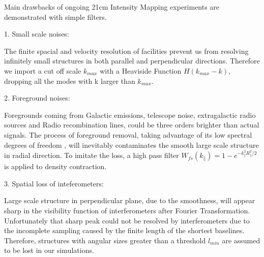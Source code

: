 Main drawbacks of ongoing 21cm Intensity Mapping 
experiments are demonstrated with simple filters. 

1. Small scale noises:

The finite spacial and velocity resolution of facilities 
prevent us from resolving infinitely small structures in both parallel and perpendicular directions. 
Therefore we import a cut off scale $k_{max}$ with a Heaviside Function 
$H(k_{max}-k)$, dropping all the modes with k larger than $k_{max}$. 

2. Foreground noises:

Foregrounds coming from Galactic emissions, telescope noise, 
extragalactic radio sources and Radio recombination lines, 
could be three orders brighter than actual signals\cite{DiMatteo04,Masui13}. 
The process of foreground removal, taking advantage of its low spectral
degrees of freedom \cite{Switzer15}, 
will inevitably contaminates the smooth large scale structure in radial direction.  
To imitate the loss, a high pass filter $W_{fs}(k_\parallel)=1-e^{-k_\parallel^2R_\parallel^2/2}$ is applied to density contraction. 

3. Spatial loss of inteferometers:

Large scale structure in perpendicular plane, due to the smoothness, 
will appear sharp in the visibility function of interferometers 
after Fourier Transformation. 
Unfortunately that sharp peak could not be resolved by interferometers 
due to the incomplete sampling  
caused by the finite length of the shortest baselines. 
Therefore, structures with angular sizes greater than a threshold $l_{min}$ 
are assumed to be lost in our simulations. 


